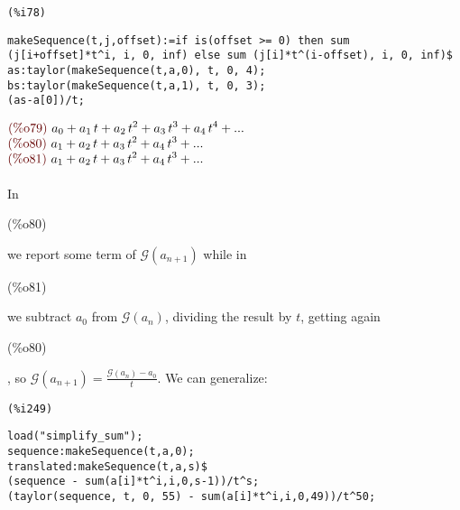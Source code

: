 \noindent
\begin{minipage}[t]{8ex}{\color{red}\bf
\begin{verbatim}
(%i78) 
\end{verbatim}}
\end{minipage}
\begin{minipage}[t]{\textwidth}{\color{blue}
\begin{verbatim}
makeSequence(t,j,offset):=if is(offset >= 0) then sum
(j[i+offset]*t^i, i, 0, inf) else sum (j[i]*t^(i-offset), i, 0, inf)$
as:taylor(makeSequence(t,a,0), t, 0, 4);
bs:taylor(makeSequence(t,a,1), t, 0, 3);
(as-a[0])/t;
\end{verbatim}}
\end{minipage}
\begin{math}\displaystyle
\parbox{8ex}{\color{labelcolor}(\%o79) }
{a}_{0}+{a}_{1}\,t+{a}_{2}\,{t}^{2}+{a}_{3}\,{t}^{3}+{a}_{4}\,{t}^{4}+...
\end{math}\\
\begin{math}\displaystyle
\parbox{8ex}{\color{labelcolor}(\%o80) }
{a}_{1}+{a}_{2}\,t+{a}_{3}\,{t}^{2}+{a}_{4}\,{t}^{3}+...
\end{math}\\
\begin{math}\displaystyle
\parbox{8ex}{\color{labelcolor}(\%o81) }
{a}_{1}+{a}_{2}\,t+{a}_{3}\,{t}^{2}+{a}_{4}\,{t}^{3}+...
\end{math}
\\\\
In \parbox{8ex}{\color{labelcolor}(\%o80) } we report some term of
$\mathcal{G}(a_{n+1})$ while in
\parbox{8ex}{\color{labelcolor}(\%o81) } we subtract $a_0$ from
$\mathcal{G} (a_n)$, dividing the result by $t$, getting
again \parbox{8ex}{\color{labelcolor}(\%o80) }, so
$\mathcal{G}(a_{n+1}) = \frac{\mathcal{G} (a_n) - a_0}{t}$. We can
generalize:\\
\noindent
\begin{minipage}[t]{8ex}{\color{red}\bf
\begin{verbatim}
(%i249) 
\end{verbatim}}
\end{minipage}
\begin{minipage}[t]{\textwidth}{\color{blue}
\begin{verbatim}
load("simplify_sum");
sequence:makeSequence(t,a,0);
translated:makeSequence(t,a,s)$
(sequence - sum(a[i]*t^i,i,0,s-1))/t^s;
(taylor(sequence, t, 0, 55) - sum(a[i]*t^i,i,0,49))/t^50;
\end{verbatim}}
\end{minipage}
